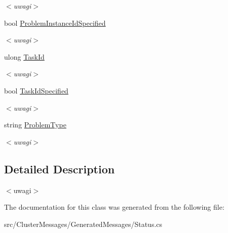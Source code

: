 \begin{DoxyCompactItemize}
\begin{DoxyCompactList}\small\item\em $<$uwagi$>$ \end{DoxyCompactList}\item 
\hypertarget{class_status_thread_a3d90339e0061a5e9becd817ac1b5c2d9}{}bool \hyperlink{class_status_thread_a3d90339e0061a5e9becd817ac1b5c2d9}{Problem\+Instance\+Id\+Specified}\label{class_status_thread_a3d90339e0061a5e9becd817ac1b5c2d9}

\begin{DoxyCompactList}\small\item\em $<$uwagi$>$ \end{DoxyCompactList}\item 
\hypertarget{class_status_thread_aecb5f93d2e149a63211de8b8339146ee}{}ulong \hyperlink{class_status_thread_aecb5f93d2e149a63211de8b8339146ee}{Task\+Id}\label{class_status_thread_aecb5f93d2e149a63211de8b8339146ee}

\begin{DoxyCompactList}\small\item\em $<$uwagi$>$ \end{DoxyCompactList}\item 
\hypertarget{class_status_thread_ac7446b65bfa8b7f61eac400762c4abfe}{}bool \hyperlink{class_status_thread_ac7446b65bfa8b7f61eac400762c4abfe}{Task\+Id\+Specified}\label{class_status_thread_ac7446b65bfa8b7f61eac400762c4abfe}

\begin{DoxyCompactList}\small\item\em $<$uwagi$>$ \end{DoxyCompactList}\item 
\hypertarget{class_status_thread_a178f63000f291d56f8cee191a1a63b5d}{}string \hyperlink{class_status_thread_a178f63000f291d56f8cee191a1a63b5d}{Problem\+Type}\label{class_status_thread_a178f63000f291d56f8cee191a1a63b5d}

\begin{DoxyCompactList}\small\item\em $<$uwagi$>$ \end{DoxyCompactList}\end{DoxyCompactItemize}


\subsection{Detailed Description}
$<$uwagi$>$ 

The documentation for this class was generated from the following file\+:\begin{DoxyCompactItemize}
\item 
src/\+Cluster\+Messages/\+Generated\+Messages/Status.\+cs\end{DoxyCompactItemize}
